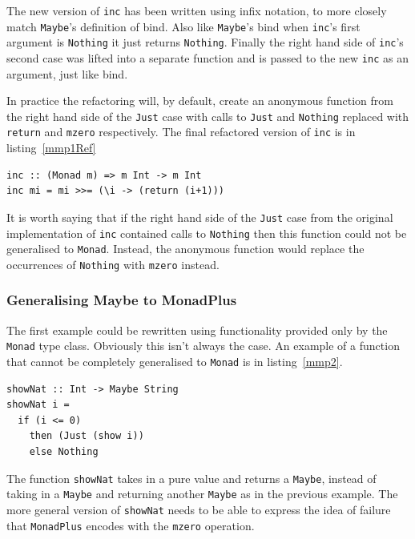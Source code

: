 The new version of \texttt{inc} has been written using infix notation, to more closely match \texttt{Maybe}'s definition of bind. Also like \texttt{Maybe}'s bind when \texttt{inc}'s first argument is \texttt{Nothing} it just returns \texttt{Nothing}. Finally the right hand side of \texttt{inc}'s second case was lifted into a separate function and is passed to the new \texttt{inc} as an argument, just like bind.

In practice the refactoring will, by default, create an anonymous function from the right hand side of the \texttt{Just} case with calls to \texttt{Just} and \texttt{Nothing} replaced with \texttt{return} and \texttt{mzero} respectively. The final refactored version of \texttt{inc} is in listing~\ref{mmp1Ref} 

\begin{lstlisting}[caption={Final output from generalising \texttt{inc}},label=mmp1Ref]
inc :: (Monad m) => m Int -> m Int
inc mi = mi >>= (\i -> (return (i+1)))
\end{lstlisting}

It is worth saying that if the right hand side of the \texttt{Just} case from the original implementation of \texttt{inc} contained calls to \texttt{Nothing} then this function could not be generalised to \texttt{Monad}. Instead, the anonymous function would replace the occurrences of \texttt{Nothing} with \texttt{mzero} instead.  
 
\subsubsection{Generalising Maybe to MonadPlus} 

The first example could be rewritten using functionality provided only by the \texttt{Monad} type class. Obviously this isn't always the case. An example of a function that cannot be completely generalised to \texttt{Monad} is in listing~\ref{mmp2}.

\begin{lstlisting}[caption={\texttt{showNat}}, label=mmp2]
showNat :: Int -> Maybe String
showNat i =
  if (i <= 0)
    then (Just (show i))
    else Nothing
\end{lstlisting}

The function \texttt{showNat} takes in a pure value and returns a \texttt{Maybe}, instead of taking in a \texttt{Maybe} and returning another \texttt{Maybe} as in the previous example. The more general version of \texttt{showNat} needs to be able to express the idea of failure that \texttt{MonadPlus} encodes with the \texttt{mzero} operation. 

